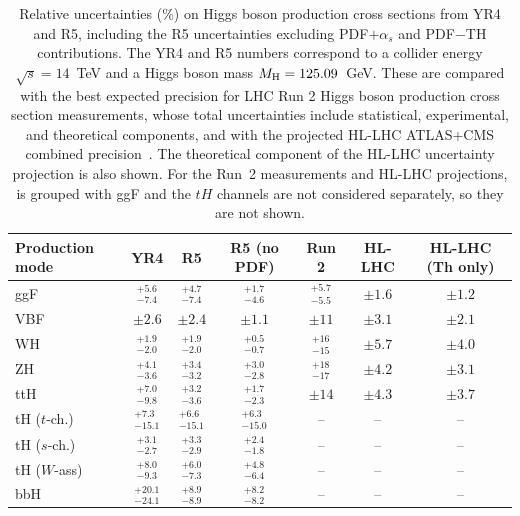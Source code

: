 \begin{table}[htbp]
\renewcommand{\arraystretch}{1.3}
\setlength{\belowcaptionskip}{10pt}
\centering
\caption{Relative uncertainties (\%) on Higgs boson production cross sections from YR4 and R5, including the R5 uncertainties excluding PDF$+\alpha_{s}$ and PDF$-$TH contributions. The YR4 and R5 numbers correspond to a collider energy $\sqrt{s} = 14$~TeV and a Higgs boson mass $M_\mathrm{H} = 125.09$~GeV. These are compared with the best expected precision for LHC Run 2 Higgs boson production cross section measurements\cite{ATLAS:2026comb,CMS:2026nce}, whose total uncertainties include statistical, experimental, and theoretical components, and with the projected HL-LHC ATLAS+CMS combined precision~\cite{ATLAS:2022hsp}. The theoretical component of the HL-LHC uncertainty projection is also shown. For the Run~2 measurements and HL-LHC projections, \bbH{} is grouped with ggF and the $tH$ channels are not considered separately, so they are not shown.}
\label{tab:prod_uncertainties}
\begin{tabular}{lcccccc}
\toprule
Production mode &
YR4 &
R5 &
R5 (no PDF) &
Run 2 &
HL-LHC &
HL-LHC (Th only) \\
\midrule
ggF          & ${}^{+5.6}_{-7.4}$  & ${}^{+4.7}_{-7.4}$  & ${}^{+1.7}_{-4.6}$  & ${}^{+5.7}_{-5.5}$ & $\pm1.6$ & $\pm1.2$ \\
VBF          & $\pm2.6$            & $\pm2.4$            & $\pm1.1$            & $\pm11$            & $\pm3.1$ & $\pm2.1$  \\
WH           & ${}^{+1.9}_{-2.0}$  & ${}^{+1.9}_{-2.0}$  & ${}^{+0.5}_{-0.7}$  & ${}^{+16}_{-15}$   & $\pm5.7$ & $\pm4.0$  \\
ZH           & ${}^{+4.1}_{-3.6}$  & ${}^{+3.4}_{-3.2}$  & ${}^{+3.0}_{-2.8}$  & ${}^{+18}_{-17}$   & $\pm4.2$ & $\pm3.1$  \\
ttH          & ${}^{+7.0}_{-9.8}$  & ${}^{+3.2}_{-3.6}$  & ${}^{+1.7}_{-2.3}$  & $\pm14$            & $\pm4.3$ & $\pm3.7$  \\
tH ($t$-ch.) & ${}^{+7.3}_{-15.1}$ & ${}^{+6.6}_{-15.1}$ & ${}^{+6.3}_{-15.0}$ & --                  & --  & -- \\
tH ($s$-ch.) & ${}^{+3.1}_{-2.7}$  & ${}^{+3.3}_{-2.9}$  & ${}^{+2.4}_{-1.8}$  & --                  & --  & -- \\
tH ($W$-ass)  & ${}^{+8.0}_{-9.3}$  & ${}^{+6.0}_{-7.3}$  & ${}^{+4.8}_{-6.4}$  & --                  & --  & -- \\
bbH          & ${}^{+20.1}_{-24.1}$& ${}^{+8.9}_{-8.9}$  & ${}^{+8.2}_{-8.2}$  & --                  & --  & -- \\
\bottomrule
\end{tabular}
\end{table}

